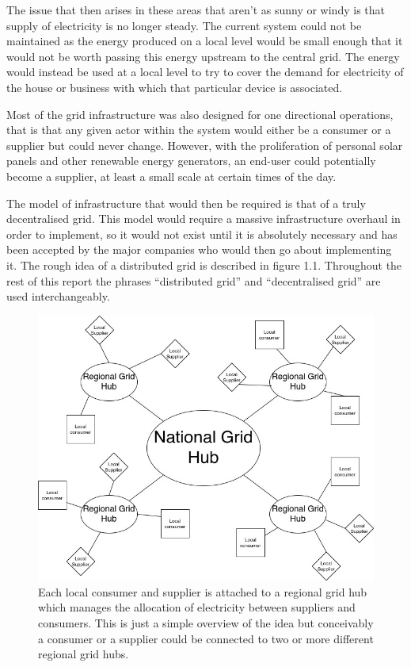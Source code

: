 \documentclass[a4paper, notitlepage]{report}
\begin{document}
The issue that then arises in these areas that aren’t as sunny or windy is that
supply of electricity is no longer steady. The current system could not be
maintained as the energy produced on a local level would be small enough that it
would not be worth passing this energy upstream to the central grid. The energy
would instead be used at a local level to try to cover the demand for
electricity of the house or business with which that particular device is
associated.

Most of the grid infrastructure was also designed for one directional
operations, that is that any given actor within the system would either be a
consumer or a supplier but could never change. However, with the proliferation
of personal solar panels and other renewable energy generators, an end-user
could potentially become a supplier, at least a small scale at certain times of
the day.

The model of infrastructure that would then be required is that of a truly
decentralised grid. This model would require a massive infrastructure overhaul
in order to implement, so it would not exist until it is absolutely necessary
and has been accepted by the major companies who would then go about
implementing it. The rough idea of a distributed grid is described in figure
1.1. Throughout the rest of this report the phrases “distributed grid” and
“decentralised grid” are used interchangeably.

\begin{figure}[htbp]
\centering
\includegraphics[width=.9\linewidth]{./img/DecentralisedGrid.jpg}
\caption{\label{fig:orgd255abb}
Each local consumer and supplier is attached to a regional grid hub which manages the allocation of electricity between suppliers and consumers. This is just a simple overview of the idea but conceivably a consumer or a supplier could be connected to two or more different regional grid hubs.}
\end{figure}
\end{document}
